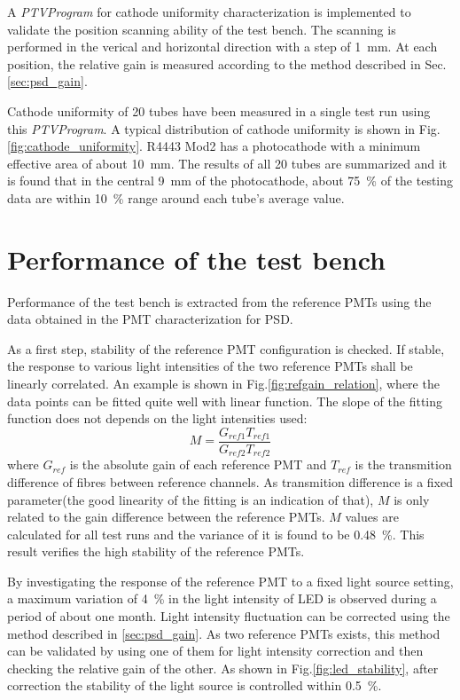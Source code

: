 \documentclass[5p, times]{elsarticle}
\begin{document}
A \textit{PTVProgram} for cathode uniformity characterization is implemented to validate the position scanning ability of the test bench.
The scanning is performed in the verical and horizontal direction with a step of \SI{1}{\milli\meter}.
At each position, the relative gain is measured according to the method described in Sec.\ref{sec:psd_gain}.

Cathode uniformity of 20 tubes have been measured in a single test run using this \textit{PTVProgram}.
A typical distribution of cathode uniformity is shown in Fig.\ref{fig:cathode_uniformity}.
R4443 Mod2 has a photocathode with a minimum effective area of about \SI{10}{\milli\meter}.
The results of all 20 tubes are summarized and it is found that in the central \SI{9}{\milli\meter} of the photocathode, about \SI{75}{\percent} of the testing data are within \textpm\SI{10}{\percent} range around each tube's average value.

\section{Performance of the test bench}
\label{sec:performance}

Performance of the test bench is extracted from the reference PMTs using the data obtained in the PMT characterization for PSD.

As a first step, stability of the reference PMT configuration is checked.
If stable, the response to various light intensities of the two reference PMTs shall be linearly correlated.
An example is shown in Fig.\ref{fig:refgain_relation}, where the data points can be fitted quite well with linear function.
The slope of the fitting function does not depends on the light intensities used:
\begin{equation}
 M = \frac{G_{ref1} T_{ref1}}{G_{ref2} T_{ref2}}
\end{equation}
where $G_{ref}$ is the absolute gain of each reference PMT and $T_{ref}$ is the transmition difference of fibres between reference channels.
As transmition difference is a fixed parameter(the good linearity of the fitting is an indication of that), $M$ is only related to the gain difference between the reference PMTs.
$M$ values are calculated for all test runs and the variance of it is found to be \SI{0.48}{\percent}.
This result verifies the high stability of the reference PMTs.

By investigating the response of the reference PMT to a fixed light source setting, a maximum variation of \SI{4}{\percent} in the light intensity of LED is observed during a period of about one month.
Light intensity fluctuation can be corrected using the method described in \ref{sec:psd_gain}.
As two reference PMTs exists, this method can be validated by using one of them for light intensity correction and then checking the relative gain of the other. 
As shown in Fig.\ref{fig:led_stability}, after correction the stability of the light source is controlled within \textpm\SI{0.5}{\percent}.
\end{document}
